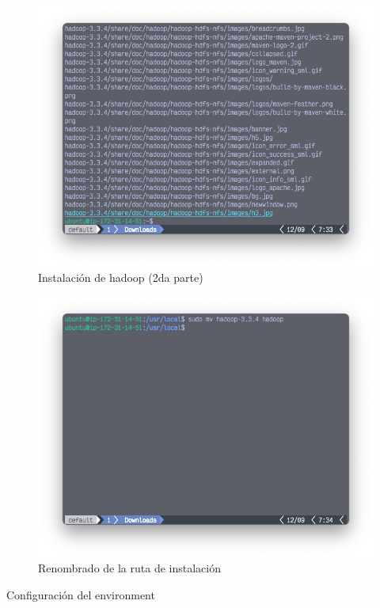 \begin{figure}[h]
	\centering
	\includegraphics[scale=.35] {img/20-tarXVFZ-2}
	\caption{Instalación de hadoop (2da parte)}
	\label{fig:20}
\end{figure}

\begin{figure}[h]
	\centering
	\includegraphics[scale=.35] {img/21-rename}
	\caption{Renombrado de la ruta de instalación}
	\label{fig:21}
\end{figure}

\clearpage

Configuración del environment

